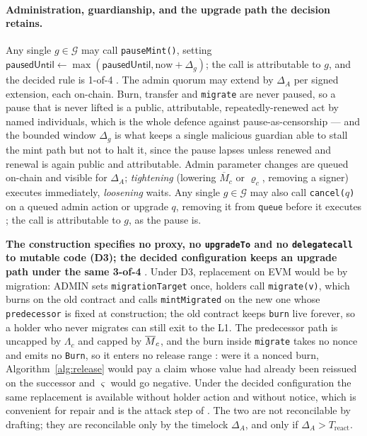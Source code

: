\paragraph{Administration, guardianship, and the upgrade path the decision retains.} Any single
$g \in \mathcal{G}$ may call \texttt{pauseMint()}, setting
$\mathsf{pausedUntil} \leftarrow \max(\mathsf{pausedUntil}, \mathrm{now} + \Delta_g)$; the call is
attributable to $g$, and the decided rule is 1-of-4 . The
admin quorum may extend by $\Delta_A$ per signed extension, each on-chain. Burn, transfer and
\texttt{migrate} are never paused, so a pause that is never lifted is a public, attributable,
repeatedly-renewed act by named individuals, which is the whole defence against
pause-as-censorship --- and the bounded window $\Delta_g$ is what keeps a single malicious guardian
able to stall the mint path but not to halt it, since the pause lapses unless renewed and renewal is
again public and attributable. Admin parameter changes are queued on-chain and visible for
$\Delta_A$; \emph{tightening} (lowering $\overline{M}_c$ or $\varrho_c$, removing a signer) executes
immediately, \emph{loosening} waits. Any single $g \in \mathcal{G}$ may also call
\texttt{cancel($q$)} on a queued admin action or upgrade $q$, removing it from $\mathsf{queue}$
before it executes ; the call is attributable to $g$, as
the pause is.

\textbf{The construction specifies no proxy, no \texttt{upgradeTo} and no \texttt{delegatecall} to
mutable code (D3); the decided configuration keeps an upgrade path under the same 3-of-4}
. Under D3, replacement on EVM would be by migration:
ADMIN sets \texttt{migration\allowbreak{}Target} once, holders call \texttt{migrate(v)}, which burns on the old
contract and calls \texttt{mintMigrated} on the new one whose \texttt{predecessor} is fixed at
construction; the old contract keeps \texttt{burn} live forever, so a holder who never migrates can
still exit to the L1. The predecessor path is uncapped by $\Lambda_c$ and capped by $\overline{M}_{c}$, and
the burn inside \texttt{migrate} takes no nonce and emits no \texttt{Burn}, so it enters no release
range : were it a nonced burn, Algorithm~\ref{alg:release}
would pay a claim whose value had already been reissued on the successor and $\varsigma$ would go
negative. Under the decided configuration the same replacement is available without
holder action and without notice, which is convenient for repair and is the attack step of
. The two are not reconcilable by drafting; they are reconcilable only by
the timelock $\Delta_A$, and only if $\Delta_A > T_{\mathrm{react}}$.

